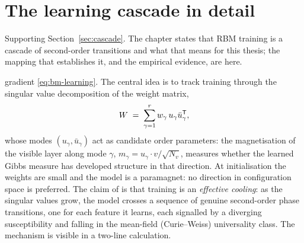 \section{The learning cascade in detail}\label{sec:cascade-detail}

Supporting Section~\ref{sec:cascade}. The chapter states that RBM training is
a cascade of second-order transitions and what that means for this thesis; the
mapping that establishes it, and the empirical evidence, are here.

gradient \eqref{eq:bm-learning}. The central idea is to track training
through the singular value decomposition of the weight matrix,
\begin{equation}
  W \;=\; \sum_{\gamma=1}^{r} w_\gamma\, u_\gamma \bar u_\gamma^{\mathsf{T}} ,
  \label{eq:rbm-svd-long}
\end{equation}
whose modes $(u_\gamma, \bar u_\gamma)$ act as candidate order
parameters: the magnetisation of the visible layer along mode $\gamma$,
$m_\gamma = u_\gamma \cdot v / \sqrt{N_v}$, measures whether the learned
Gibbs measure has developed structure in that direction. At
initialisation the weights are small and the model is a paramagnet: no
direction in configuration space is preferred. The claim of
\citet{bachtis2024cascade} is that training is an \emph{effective
cooling}: as the singular values grow, the model crosses a sequence of
genuine second-order phase transitions, one for each feature it learns,
each signalled by a diverging susceptibility and falling in the
mean-field (Curie--Weiss) universality class. The mechanism is visible in
a two-line calculation.

